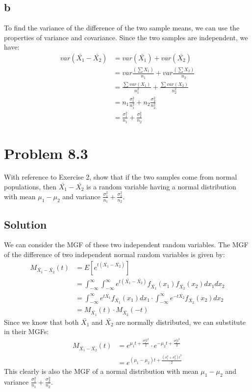 \documentclass{article}
\begin{document}
\subsection*{b}
To find the variance of the difference of the two sample means, we can use the properties of variance and covariance. Since the two samples are independent, we have:
\begin{align*}
var(\bar{X_1} - \bar{X_2}) &= var(\bar{X_1}) + var(\bar{X_2}) \\
&= var\frac{(\sum X_1)}{n_1} + var\frac{(\sum X_2)}{n_2} \\
&= \frac{\sum var(X_1)}{n_1^2} + \frac{\sum var(X_2)}{n_2^2} \\
&= n_1\frac{\sigma_1^2}{n_1^2} + n_2\frac{\sigma_2^2}{n_2^2} \\
&= \frac{\sigma_1^2}{n_1} + \frac{\sigma_2^2}{n_2}
\end{align*}


\section*{Problem 8.3}
With reference to Exercise 2, show that if the two samples come from normal populations, then $\bar{X_1} - \bar{X_2}$ is a random variable having a normal distribution with mean $\mu_1 - \mu_2$ and variance $\frac{\sigma_1^2}{n_1} + \frac{\sigma_2^2}{n_2}$.
\subsection*{Solution}
We can consider the MGF of these two independent random variables. The MGF of the difference of two independent normal random variables is given by:
\begin{align*}
M_{\bar{X_1} - \bar{X_2}}(t) &= E[e^{t(\bar{X_1} - \bar{X_2})}] \\
&= \int_{-\infty}^{\infty} \int_{-\infty}^{\infty} e^{t(\bar{X_1} - \bar{X_2})} f_{\bar{X_1}}(x_1) f_{\bar{X_2}}(x_2) dx_1 dx_2 \\
&= \int_{-\infty}^{\infty} e^{t\bar{X_1}} f_{\bar{X_1}}(x_1) dx_1 \cdot \int_{-\infty}^{\infty} e^{-t\bar{X_2}} f_{\bar{X_2}}(x_2) dx_2 \\
&= M_{\bar{X_1}}(t) \cdot M_{\bar{X_2}}(-t)
\end{align*}
Since we know that both $\bar{X_1}$ and $\bar{X_2}$ are normally distributed, we can substitute in their MGFs: 
\begin{align*}
    M_{\bar{X_1} - \bar{X_2}}(t) &= e^{\mu_1 t + \frac{\sigma_1^2 t^2}{2}} \cdot e^{-\mu_2 t + \frac{\sigma_2^2 t^2}{2}} \\
    &= e^{(\mu_1 - \mu_2)t + \frac{(\sigma_1^2 + \sigma_2^2)t^2}{2}}
\end{align*}
This clearly is also the MGF of a normal distribution with mean $\mu_1 - \mu_2$ and variance $\frac{\sigma_1^2}{n_1} + \frac{\sigma_2^2}{n_2}$.
\end{document}
